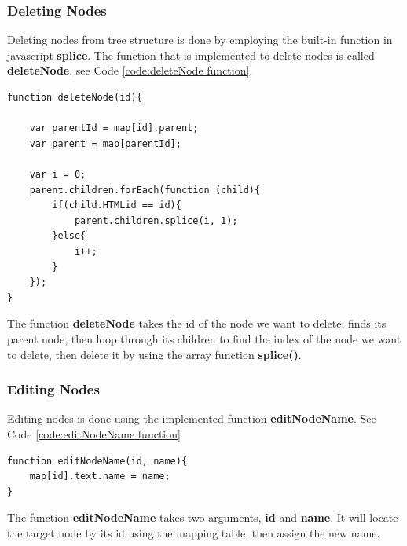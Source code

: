 \documentclass[11pt]{article} %
\begin{document}
\subsubsection{Deleting Nodes}
Deleting nodes from tree structure is done by employing the built-in function in javascript \textbf{splice}. The function that is implemented to delete nodes is called \textbf{deleteNode}, see Code \ref{code:deleteNode function}.

\noindent
\begin{minipage}[c]{\linewidth}
\begin{lstlisting}[basicstyle=\scriptsize, tabsize=4, frame=single, caption=deleteNode Function, label=code:deleteNode function]
function deleteNode(id){

	var parentId = map[id].parent;
	var parent = map[parentId];
	
	var i = 0;
	parent.children.forEach(function (child){
		if(child.HTMLid == id){
			parent.children.splice(i, 1);
		}else{
			i++;
		}
	});
}
\end{lstlisting}
\end{minipage}

\noindent
The function \textbf{deleteNode} takes the id of the node we want to delete, finds its parent node, then loop through its children to find the index of the node we want to delete, then delete it by using the array function \textbf{splice()}.

\subsubsection{Editing Nodes}
Editing nodes is done using the implemented function \textbf{editNodeName}. See Code \ref{code:editNodeName function}

\noindent
\begin{minipage}[c]{\linewidth}
\begin{lstlisting}[basicstyle=\scriptsize, tabsize=4, frame=single, caption=editNodeName Function, label=code:editNodeName function]
function editNodeName(id, name){
	map[id].text.name = name;
}

\end{lstlisting}
\end{minipage}

\noindent
The function \textbf{editNodeName} takes two arguments, \textbf{id} and \textbf{name}. It will locate the target node by its id using the mapping table, then assign the new name.
\end{document}
